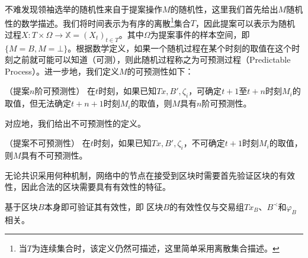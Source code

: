 不难发现领袖选举的随机性来自于提案操作$M$的随机性，这里我们首先给出$M$随机性的数学描述。我们将时间表示为有序的离散\footnote{当$T$为连续集合时，该定义仍然可描述，这里简单采用离散集合描述。}集合$T$，因此提案可以表示为随机过程$X:T\times \Omega\rightarrow \mathbb{X}=(X_t)_{t\in T}$。其中$\Omega$为提案事件的样本空间，即$\{M=B,M=\bot\}$。根据数学定义\cite{van2013introduction}，如果一个随机过程在某个时刻的取值在这个时刻之前就可能可以知道（可测），则此随机过程称之为可预测过程（Predictable Process）。进一步地，我们定义$M$的可预测性如下：

\begin{definition}
（提案$n$阶可预测性） 在$t$时刻，如果已知$Tx,B',\zeta_i$，可确定$t+1$至$t+n$时刻$M_i$的取值，但无法确定$t+n+1$时刻$M_i$的取值，则$M$具有$n$阶可预测性。
\end{definition}

对应地，我们给出不可预测性的定义。

\begin{definition}
（提案不可预测性） 在$t$时刻，如果已知$Tx,B',\zeta_i$，不可确定$t+1$时刻$M_i$的取值，则$M$具有不可预测性。
\end{definition}




无论共识采用何种机制，网络中的节点在接受到区块时需要首先验证区块的有效性，因此合法的区块需要具有有效性的特征。

\begin{property}
基于区块$B$本身即可验证其有效性，即                                                                                                                                                                                                                                                                                                                                                                                                                                                                                                                                                                                                                                                                                                                                                                   区块$B$的有效性仅与交易组$Tx_B$、$B^{\prec}$和$\varphi_B$相关。	
\end{property}

